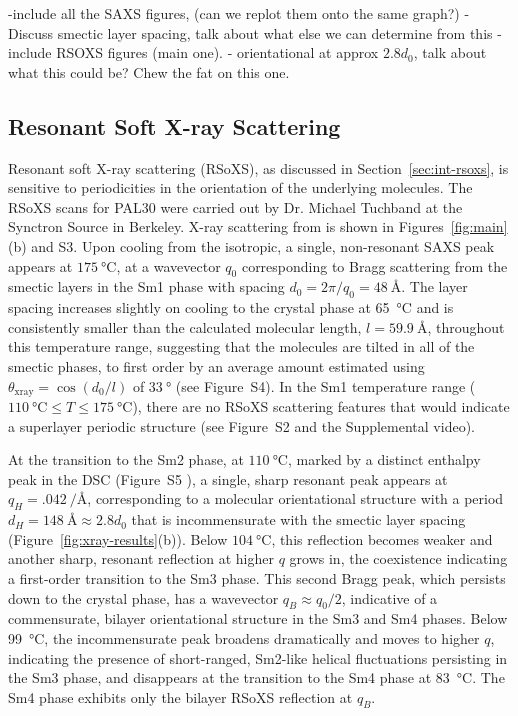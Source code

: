 -include all the SAXS figures, (can we replot them onto the same graph?)
- Discuss smectic layer spacing, talk about what else we can determine from this
-include RSOXS figures (main one).
- orientational at approx $2.8 d_0$, talk about what this could be? Chew the fat
on this one.
\subsection{Resonant Soft X-ray Scattering}
Resonant soft X-ray scattering (RSoXS), as discussed in
Section~\ref{sec:int-rsoxs}, is sensitive to periodicities in the orientation of
the underlying molecules. The RSoXS scans for PAL30 were carried out by Dr.
Michael Tuchband at the Synctron Source in Berkeley.
X-ray scattering from  is shown in Figures~\ref{fig:main}(b) and S3.
Upon  cooling from the isotropic, a single, non-resonant SAXS peak
appears at $\SI{175}{\degreeCelsius}$, at a wavevector $q_0$  corresponding to Bragg scattering from
the smectic layers in the Sm1 phase with spacing $d_0 = 2\pi/q_0
= \SI{48}{\angstrom}$. The layer spacing increases slightly on cooling
to the crystal phase at \SI{65}{\degreeCelsius} and is
consistently smaller than the calculated molecular length, $l = \SI{59.9}{\angstrom}$, throughout this temperature range, suggesting that the molecules are tilted in all of the smectic phases, to first order by an average amount estimated using $\theta_\textrm{xray} =
\cos(d_0/l)$ of $\SI{33}{\degree}$ (see Figure~S4).
In the Sm1 temperature range ($\SI{110}{\degreeCelsius} \leq T \leq
\SI{175}{\degreeCelsius}$), there are no RSoXS scattering features that would indicate a
superlayer periodic structure (see Figure~S2 and the Supplemental video).

At the transition to the Sm2 phase, at $\SI{110}{\degreeCelsius}$, marked  by
a distinct enthalpy peak in the DSC (Figure~S5
), a single, sharp
resonant peak appears at $q_H = \SI[per-mode=reciprocal]{.042}{\per\angstrom}$, corresponding
to a molecular orientational structure with a period
$d_H=\SI{148}{\angstrom}\approx 2.8 d_0$ that is incommensurate with the
smectic layer spacing (Figure~\ref{fig:xray-results}(b)). Below
$\SI{104}{\degreeCelsius}$, this reflection
becomes weaker and another sharp, resonant reflection at higher $q$ grows in, the coexistence
indicating a first-order transition to the Sm3 phase.
This second Bragg peak, which persists down to the crystal phase, has a
wavevector $q_B\approx q_0/2$, indicative of a commensurate, bilayer orientational
structure in the Sm3 and Sm4 phases.
%
Below \SI{99}{\degreeCelsius}, the incommensurate peak broadens dramatically and
moves to higher $q$, indicating the presence of short-ranged, Sm2-like helical
fluctuations persisting in the Sm3 phase, and disappears at the transition to the Sm4
phase at \SI{83}{\degreeCelsius}. The Sm4 phase exhibits only the bilayer RSoXS
reflection at $q_B$.

